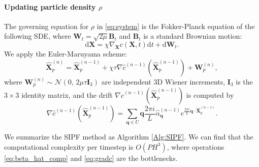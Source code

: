 \documentclass[review,onefignum,onetabnum]{siamart250211}
\begin{document}
\paragraph{Updating particle density \(\rho\)} \label{subsec:particle_simulation}
The governing equation for \(\rho\) in \eqref{eq:system} is the Fokker-Planck equation of the following SDE, where \(\mathbf{W}_{t} = \sqrt{2 \mu} \mathbf{B}_{t}\) and \(\mathbf{B}_{t}\) is a standard Brownian motion:
\begin{equation}
\label{eq:SDE}
\mathrm{d}\mathbf{X} = \chi \nabla_{\mathbf{X}} c (\mathbf{X},t)\mathrm{d}t + \mathrm{d}\mathbf{W}_{t}.
\end{equation}
We apply the Euler-Maruyama scheme:  
\begin{equation}
\widehat{\mathbf{X}}_p^{(n)} = \widehat{\mathbf{X}}_p^{(n-1)} + \chi \tau \nabla \hat{c}^{(n-1)}(\widehat{\mathbf{X}}_p^{(n-1)}) + \mathbf{W}_p^{(n)},
\label{eq:rho_hat_update}
\end{equation}
where \(\mathbf{W}_p^{(n)} \sim \mathcal{N}(0,\, 2\mu\tau \mathbf{I}_3) \) are independent 3D Wiener increments, \( \mathbf{I}_3 \) is the \( 3 \times 3 \) identity matrix, and the drift \(\nabla \hat{c}^{(n-1)}(\widehat{\mathbf{X}}_p^{(n-1)})\) is computed by
\begin{equation}
\label{eq:gradc}
\nabla \hat{c}^{(n-1)}(\widehat{\mathbf{X}}_p^{(n-1)}) = \sum_{\mathbf{q} \in U}  \mathbf{q} \frac{2\pi i}{L} \hat{\alpha}^{(n-1)}_{\mathbf{q}} e^{\frac{2\pi i}{L} \mathbf{q} \cdot \widehat{\mathbf{X}}_p^{(n-1)}} .
\end{equation}

We summarize the SIPF method as Algorithm \ref{Alg:SIPF}. We can find that the computational complexity per timestep is $O\left( P H^3 \right)$, where operations \eqref{eq:beta_hat_comp} and \eqref{eq:gradc} are the bottlenecks.
\end{document}
